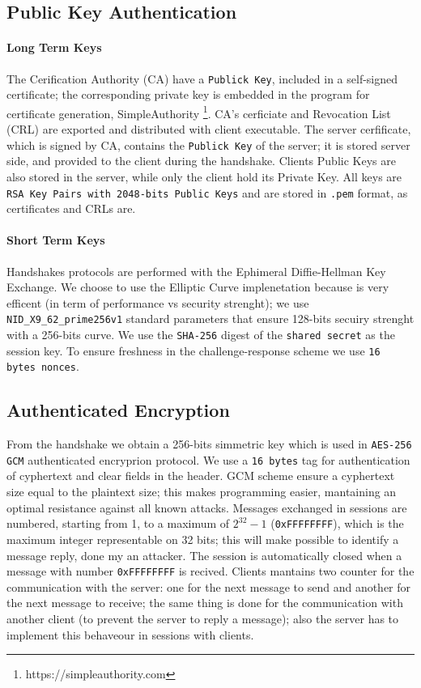 \documentclass[11pt]{report}
\begin{document}
\subsection{Public Key Authentication}
\paragraph*{Long Term Keys}
The Cerification Authority (CA) have a \texttt{Publick Key}, included in a self-signed
certificate; the corresponding private key is embedded in the program for certificate generation, 
SimpleAuthority \footnote{https://simpleauthority.com}.
CA's cerficiate and Revocation List (CRL) are exported and distributed with client executable.
The server cerfificate, which is signed by CA, contains the \texttt{Publick Key} of the server; it
is stored server side, and provided to the client during the handshake.
Clients Public Keys are also stored in the server, while only the client hold its Private Key.
All keys are \texttt{RSA Key Pairs with 2048-bits Public Keys} and are stored in \texttt{.pem} format, as certificates and CRLs are.
\paragraph*{Short Term Keys}
Handshakes protocols are performed with the Ephimeral Diffie-Hellman Key Exchange. 
We choose to use the Elliptic Curve implenetation because is very efficent (in term of performance vs security strenght);
we use \verb|NID_X9_62_prime256v1| standard parameters that ensure 128-bits secuiry strenght with a 256-bits curve. We use the \texttt{SHA-256} digest of the \texttt{shared secret} as
the session key.
To ensure freshness in the challenge-response scheme we use \texttt{16 bytes nonces}.
\subsection{Authenticated Encryption}
From the handshake we obtain a 256-bits simmetric key which is used in \texttt{AES-256 GCM} authenticated encryprion protocol.
We use a \texttt{16 bytes} tag for authentication of cyphertext and clear fields in the header. GCM scheme ensure a cyphertext
size equal to the plaintext size; this makes programming easier, mantaining an optimal resistance against all known attacks.
Messages exchanged in sessions are numbered, starting from 1, to a maximum of $2^{32}-1$ (\verb|0xFFFFFFFF|), which is the
maximum integer representable on 32 bits; this will make possible to identify a message reply, done
my an attacker. The session is automatically closed when a message with number \verb|0xFFFFFFFF| is recived.
Clients mantains two counter for the communication with the server:  one for the next message to send and another for
the next message to receive; the same thing is done for the communication with another client (to prevent the server to 
reply a message); also the server has to implement this behaveour in sessions with clients.
\end{document}
